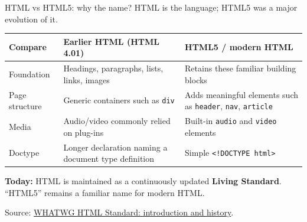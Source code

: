 \documentclass[aspectratio=169,12pt]{beamer}
\begin{document}
\begin{frame}{HTML vs HTML5: why the name?}
\small
HTML is the language; HTML5 was a major evolution of it.
\medskip

\begingroup
\renewcommand{\arraystretch}{1.3}
\setlength{\tabcolsep}{5pt}
\begin{tabular}{@{}p{.17\linewidth}p{.36\linewidth}p{.36\linewidth}@{}}
\hline
\textbf{Compare} & \textbf{Earlier HTML (HTML 4.01)} & \textbf{HTML5 / modern HTML} \\
\hline
Foundation & Headings, paragraphs, lists, links, images & Retains these familiar building blocks \\
Page structure & Generic containers such as \texttt{div} & Adds meaningful elements such as \texttt{header}, \texttt{nav}, \texttt{article} \\
Media & Audio/video commonly relied on plug-ins & Built-in \texttt{audio} and \texttt{video} elements \\
Doctype & Longer declaration naming a document type definition & Simple \texttt{<!DOCTYPE html>} \\
\hline
\end{tabular}
\endgroup
\medskip

\textbf{Today:} HTML is maintained as a continuously updated \textbf{Living Standard}. ``HTML5'' remains a familiar name for modern HTML.
\par\smallskip
{\scriptsize Source: \href{https://html.spec.whatwg.org/multipage/introduction.html}{WHATWG HTML Standard: introduction and history}.}
\end{frame}
\end{document}
